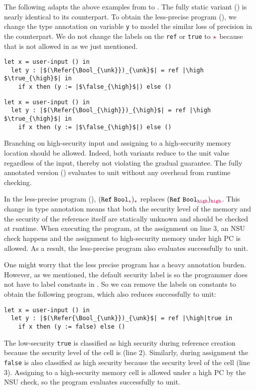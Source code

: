 The following adapts the above examples from \GSLRef to \Surface. The fully
static variant () is nearly identical to its \GSLRef counterpart.
To obtain the less-precise program (), we change the type annotation
on variable \texttt{y} to model the similar loss of precision in the \GSLRef
counterpart. We do not change the labels on the \texttt{ref} or \texttt{true} to
$\unk$ because that is not allowed in \Surface as we just mentioned.

\noindent
{}
\begin{lstlisting}[style=tt,basicstyle=\ttfamily\footnotesize]
  let x = user-input () in
  let y : |$(\Refer{\Bool_{\unk}})_{\unk}$| = ref |\high $\true_{\high}$| in
    if x then (y := |$\false_{\high}$|) else ()
\end{lstlisting}
\noindent
{}
\begin{lstlisting}[style=tt,basicstyle=\ttfamily\footnotesize]
  let x = user-input () in
  let y : |$(\Refer{\Bool_{\high}})_{\high}$| = ref |\high $\true_{\high}$| in
    if x then (y := |$\false_{\high}$|) else ()
\end{lstlisting}

\noindent Branching on high-security input and assigning to a high-security
memory location should be allowed. Indeed, both variants reduce to the unit
value regardless of the input, thereby not violating the gradual guarantee. The
fully annotated version () evaluates to unit without any
overhead from runtime checking.

In the less-precise program (), $(\Refer{\Bool_{\unk}})_{\unk}$
replaces $(\Refer{\Bool_{\high}})_{\high}$. This change in type annotation means
that both the security level of the memory and the security of the reference
itself are statically unknown and should be checked at runtime. When executing
the program, at the assignment on line 3, an NSU check happens and the
assignment to high-security memory under high PC is allowed. As a result, the
less-precise program also evaluates successfully to unit.

One might worry that the less precise program has a heavy annotation burden.
However, as we mentioned, the default security label is \low so the programmer
does not have to label constants in \Surface. So we can remove the labels on
constants to obtain the following program, which also reduces successfully to
unit:
\begin{lstlisting}[style=tt]
  let x = user-input () in
  let y : |$(\Refer{\Bool_{\unk}})_{\unk}$| = ref |\high|true in
    if x then (y := false) else ()
\end{lstlisting}
\noindent The low-security \texttt{true} is classified as high security during
reference creation because the security level of the cell is \high (line 2).
Similarly, during assignment the \texttt{false} is also classified as high
security because the security level of the cell (line 3). Assigning to a
high-security memory cell is allowed under a high PC by the NSU check, so the
program evaluates successfully to unit.

